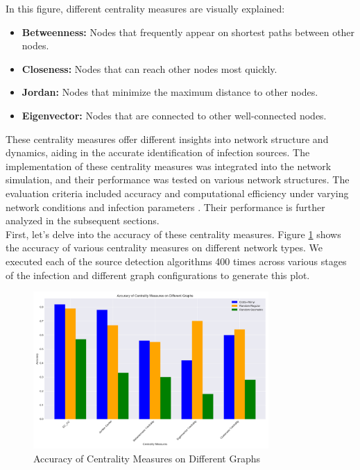 In this figure, different centrality measures are visually explained:
\begin{itemize}
    \item \textbf{Betweenness:} Nodes that frequently appear on shortest paths between other nodes.
    \item \textbf{Closeness:} Nodes that can reach other nodes most quickly.
    \item \textbf{Jordan:} Nodes that minimize the maximum distance to other nodes.
    \item \textbf{Eigenvector:} Nodes that are connected to other well-connected nodes.
\end{itemize}

These centrality measures offer different insights into network structure and dynamics, aiding in the accurate identification of infection sources. The implementation of these centrality measures was integrated into the network simulation, and their performance was tested on various network structures. The evaluation criteria included accuracy and computational efficiency under varying network conditions and infection parameters \cite{liu2011}. Their performance is further analyzed in the subsequent sections.\\

First, let's delve into the accuracy of these centrality measures. Figure \ref{fig:accuracy_centrality_measures} shows the accuracy of various centrality measures on different network types. We executed each of the source detection algorithms 400 times across various stages of the infection and different graph configurations to generate this plot.

\begin{figure}[H]
    \centering
    \includegraphics[width=0.8\textwidth]{Accuracy_Centrality_Measures.png}
    \caption{Accuracy of Centrality Measures on Different Graphs}
    \label{fig:accuracy_centrality_measures}
\end{figure}

